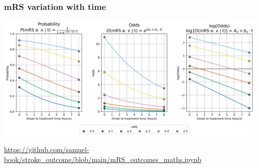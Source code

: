 \documentclass[xcolor={usenames,dvipsnames}]{beamer}
\newcommand{\smallurl}[1]{\textcolor{blue}{\fontsize{4pt}{4.8pt}\selectfont \url{#1}}}
\begin{document}

\begin{frame}
\frametitle{mRS variation with time}

\begin{center} 
\includegraphics[width=\textwidth]{./images/time_varying_probs_odds_logodds}
\end{center} 

\vspace{1em}
\smallurl{https://github.com/samuel-book/stroke_outcome/blob/main/mRS_outcomes_maths.ipynb}

\end{frame}


\end{document}
